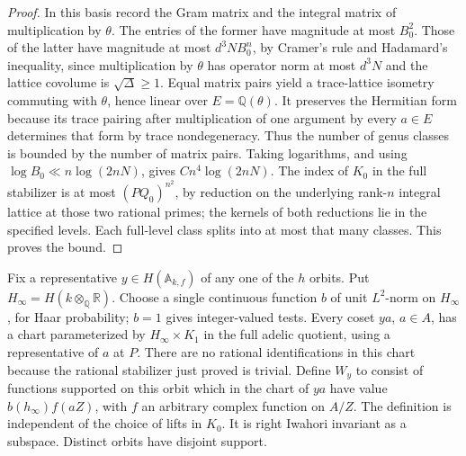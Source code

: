 \documentclass[a4paper,11pt]{article}
\theoremstyle{definition}
\theoremstyle{remark}
\newcommand{\RR}{\mathbb R}\newcommand{\CC}{\mathbb C}\newcommand{\QQ}{\mathbb Q}
\numberwithin{equation}{section}
\begin{document}
\begin{proof}
In this basis record the Gram matrix and the integral matrix of multiplication by \(\theta\). The entries of the former have magnitude at most \(B_0^2\). Those of the latter have magnitude at most \(d^3NB_0^n\), by Cramer's rule and Hadamard's inequality, since multiplication by \(\theta\) has operator norm at most \(d^3N\) and the lattice covolume is \(\sqrt\Delta\ge1\). Equal matrix pairs yield a trace-lattice isometry commuting with \(\theta\), hence linear over \(E=\QQ(\theta)\). It preserves the Hermitian form because its trace pairing after multiplication of one argument by every \(a\in E\) determines that form by trace nondegeneracy. Thus the number of genus classes is bounded by the number of matrix pairs. Taking logarithms, and using \(\log B_0\ll n\log(2nN)\), gives \(C n^4\log(2nN)\). The index of \(K_0\) in the full stabilizer is at most \((P Q_0)^{n^2}\), by reduction on the underlying rank-\(n\) integral lattice at those two rational primes; the kernels of both reductions lie in the specified levels. Each full-level class splits into at most that many classes. This proves the bound.
\end{proof}

Fix a representative \(y\in H(\mathbb A_{k,f})\) of any one of the \(h\) orbits. Put \(H_\infty=H(k\otimes_\QQ\RR)\). Choose a single continuous function \(b\) of unit \(L^2\)-norm on \(H_\infty\), for Haar probability; \(b=1\) gives integer-valued tests. Every coset \(ya\), \(a\in A\), has a chart parameterized by \(H_\infty\times K_1\) in the full adelic quotient, using a representative of \(a\) at \(P\). There are no rational identifications in this chart because the rational stabilizer just proved is trivial. Define \(W_y\) to consist of functions supported on this orbit which in the chart of \(ya\) have value \(b(h_\infty)f(aZ)\), with \(f\) an arbitrary complex function on \(A/Z\). The definition is independent of the choice of lifts in \(K_0\). It is right Iwahori invariant as a subspace. Distinct orbits have disjoint support.
\end{document}
